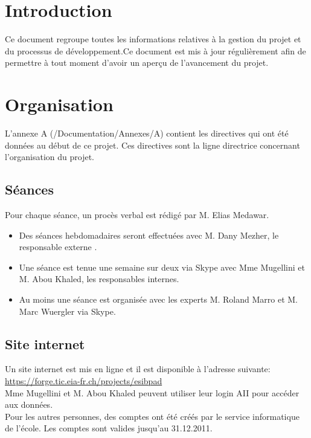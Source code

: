 	\section{Introduction}
	Ce document regroupe toutes les informations relatives à la gestion du projet et du processus de développement.Ce document est mis à jour régulièrement afin de permettre à tout moment d'avoir un aperçu de l'avancement du projet.
\section{Organisation}
	L'annexe A (/Documentation/Annexes/A) contient les directives qui ont été données au début de ce projet. Ces directives sont la ligne directrice concernant l'organisation du projet. 
	\subsection{Séances}
		Pour chaque séance, un procès verbal est rédigé par M. Elias Medawar.
	\begin{itemize}
		\item Des séances hebdomadaires seront effectuées avec M. Dany Mezher, le responsable externe .
		\item Une séance est tenue une semaine sur deux via Skype avec Mme Mugellini et M. Abou Khaled, les responsables internes.
		\item Au moins une séance est organisée avec les experts M. Roland Marro et M. Marc Wuergler via Skype.
	\end{itemize}
	\subsection{Site internet}
		Un site internet est mis en ligne et il est disponible à l'adresse suivante: \url{https://forge.tic.eia-fr.ch/projects/esibpad} \\
		Mme Mugellini et M. Abou Khaled peuvent utiliser leur login AII pour accéder aux données.\\
		Pour les autres personnes, des comptes ont été créés par le service informatique de l'école. Les comptes sont valides jusqu'au 31.12.2011. \\[1cm]
		
